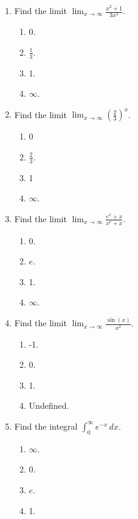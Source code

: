 \documentclass{article}
\begin{document}
\begin{enumerate}

  \item Find the limit $\displaystyle \lim_{x\to\infty} \frac{x^2+1}{3x^2}$.
  \begin{enumerate}
    \item 0.
    \item $\frac{1}{3}$. %
    \item 1.
    \item $\infty$.
  \end{enumerate}
  
  \item Find the limit $\displaystyle \lim_{x\to\infty} \left(\frac{2}{3}\right)^x$.
  \begin{enumerate}
    \item 0 %
    \item $\frac{2}{3}$. 
    \item 1
    \item $\infty$.
  \end{enumerate}


  \item Find the limit $\displaystyle \lim_{x\to\infty} \frac{e^x+x}{x^e+x}$.
  \begin{enumerate}
    \item 0. 
    \item $e$. 
    \item 1.
    \item $\infty$. %
  \end{enumerate}
  
  \item Find the limit $\displaystyle \lim_{x\to\infty} \frac{\sin(x)}{x^2}$.
  \begin{enumerate}
    \item -1. 
    \item 0. %
    \item 1.
    \item Undefined. 
  \end{enumerate}
  
  \item Find the integral $\displaystyle \int_{0}^\infty e^{-x} \, dx$.
  \begin{enumerate}
   
    \item $\infty$. 
    \item 0. 
    \item $e$. 
    \item 1. %
  \end{enumerate}


\end{enumerate}
\end{document}
